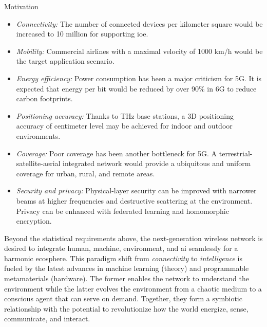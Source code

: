 \begin{section}{Motivation}
\begin{itemize}
		\item \emph{Connectivity:} The number of connected devices per kilometer square would be increased to 10 million for supporting \gls{ioe}.
		\item \emph{Mobility:} Commercial airlines with a maximal velocity of 1000 km/h would be the target application scenario.
		\item \emph{Energy efficiency:} Power consumption has been a major criticism for 5G. It is expected that energy per bit would be reduced by over 90\% in 6G to reduce carbon footprints.
		\item \emph{Positioning accuracy:} Thanks to THz base stations, a 3D positioning accuracy of centimeter level may be achieved for indoor and outdoor environments.
		\item \emph{Coverage:} Poor coverage has been another bottleneck for 5G. A terrestrial-satellite-aerial integrated network would provide a ubiquitous and uniform coverage for urban, rural, and remote areas.
		\item \emph{Security and privacy:} Physical-layer security can be improved with narrower beams at higher frequencies and destructive scattering at the environment. Privacy can be enhanced with federated learning and homomorphic encryption.
	\end{itemize}

	Beyond the statistical requirements above, the next-generation wireless network is desired to integrate human, machine, environment, and \gls{ai} seamlessly for a harmonic ecosphere.
	This paradigm shift from \emph{connectivity} to \emph{intelligence} is fueled by the latest advances in machine learning (theory) and programmable metamaterials (hardware).
	The former enables the network to understand the environment while the latter evolves the environment from a chaotic medium to a conscious agent that can serve on demand.
	Together, they form a symbiotic relationship with the potential to revolutionize how the world energize, sense, communicate, and interact.


\end{section}
